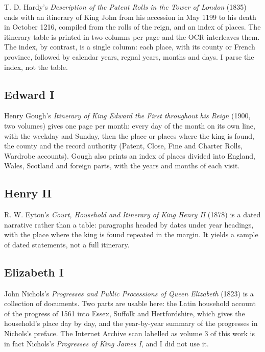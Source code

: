 \documentclass[11pt,a4paper]{article}
\begin{document}
T. D. Hardy's \textit{Description of the Patent Rolls in the Tower of London} (1835) ends with an itinerary of King John from his accession in May 1199 to his death in October 1216, compiled from the rolls of the reign, and an index of places. The itinerary table is printed in two columns per page and the OCR interleaves them. The index, by contrast, is a single column: each place, with its county or French province, followed by calendar years, regnal years, months and days. I parse the index, not the table.

\subsection{Edward I}

Henry Gough's \textit{Itinerary of King Edward the First throughout his Reign} (1900, two volumes) gives one page per month: every day of the month on its own line, with the weekday and Sunday, then the place or places where the king is found, the county and the record authority (Patent, Close, Fine and Charter Rolls, Wardrobe accounts). Gough also prints an index of places divided into England, Wales, Scotland and foreign parts, with the years and months of each visit.

\subsection{Henry II}

R. W. Eyton's \textit{Court, Household and Itinerary of King Henry II} (1878) is a dated narrative rather than a table: paragraphs headed by dates under year headings, with the place where the king is found repeated in the margin. It yields a sample of dated statements, not a full itinerary.

\subsection{Elizabeth I}

John Nichols's \textit{Progresses and Public Processions of Queen Elizabeth} (1823) is a collection of documents. Two parts are usable here: the Latin household account of the progress of 1561 into Essex, Suffolk and Hertfordshire, which gives the household's place day by day, and the year-by-year summary of the progresses in Nichols's preface. The Internet Archive scan labelled as volume 3 of this work is in fact Nichols's \textit{Progresses of King James I}, and I did not use it.
\end{document}
